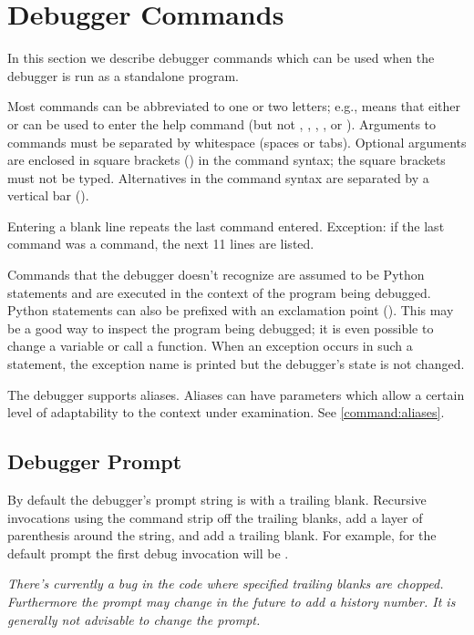 \section{Debugger Commands\label{pydb-commands}}

In this section we describe debugger commands which can be used when
the debugger is run as a standalone program.

Most commands can be abbreviated to one or two letters;
e.g.,  means that either  or  can be
used to enter the help command (but not , ,
, , or ).  Arguments to commands must
be separated by whitespace (spaces or tabs).  Optional arguments are
enclosed in square brackets (\samp{[]}) in the command syntax; the
square brackets must not be typed.  Alternatives in the command syntax
are separated by a vertical bar (\samp{|}).

Entering a blank line repeats the last command entered.  Exception: if
the last command was a  command, the next 11 lines are
listed.

Commands that the debugger doesn't recognize are assumed to be Python
statements and are executed in the context of the program being
debugged.  Python statements can also be prefixed with an exclamation
point (\samp{!}).  This may be a good way to inspect the program being
debugged; it is even possible to change a variable or call a function.
When an exception occurs in such a statement, the exception name is
printed but the debugger's state is not changed.

The debugger supports aliases.  Aliases can have parameters which
allow a certain level of adaptability to the context under
examination. See \ref{command:aliases}.

\subsection{Debugger Prompt}\label{debugger:prompt}

By default the debugger's prompt string is  with 
a trailing blank. Recursive invocations using the
 command strip off the trailing blanks, add a layer of
parenthesis around the string, and add a trailing blank. For example,
for the default prompt the first debug invocation will be
.

\emph{There's currently a bug in the code where specified trailing
blanks are chopped. Furthermore the prompt may change in the future to
add a history number. It is generally not advisable to change the
prompt.}

